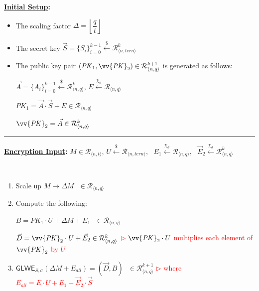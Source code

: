 \begin{tcolorbox}[title={\textbf{\tboxlabel{\ref*{subsec:glwe-public-key-enc}} RLWE Public Key Encryption ($k=1$)}}]

\textbf{\underline{Initial Setup}:} 
\begin{itemize}
\item The scaling factor $\Delta = \left\lfloor\dfrac{q}{t}\right\rfloor$
\item The secret key $\vec{S} = \{S_i\}_{i=0}^{k-1} \xleftarrow{\$} \mathcal{R}_{\langle n, \textit{tern} \rangle}^k$
\item The public key pair $(\mathit{PK}_1, \vv{\mathit{PK}}_2) \in \mathcal{R}_{\langle n, q \rangle}^{k+1}$ is generated as follows:

$\vec{A} = \{A_i\}_{i=0}^{k-1} \xleftarrow{\$} \mathcal{R}_{\langle n, q \rangle}^k$, \text{ } $E \xleftarrow{\chi_{\sigma}} \mathcal{R}_{\langle n, q \rangle}$

$\mathit{PK}_1 = \vec{A} \cdot \vec{S} + E \in \mathcal{R}_{\langle n, q \rangle}$

$\vv{\mathit{PK}}_2 = \vec{A} \in \mathcal{R}_{\langle n, q \rangle}^{k}$

\end{itemize}

\par\noindent\rule{\textwidth}{0.4pt}

\textbf{\underline{Encryption Input}:} $M \in \mathcal{R}_{\langle n, t \rangle}$, \text{ } $U \xleftarrow{\$} \mathcal{R}_{\langle n,\textit{tern} \rangle}, \text{ } E_1 \xleftarrow{\chi_{\sigma}} \mathcal{R}_{\langle n,q \rangle}, \text{ } \vec{E}_2 \xleftarrow{\chi_{\sigma}} \mathcal{R}_{\langle n,q \rangle}^k$

$ $

\begin{enumerate}

\item Scale up $M \longrightarrow \Delta M \text { } \in \mathcal{R}_{\langle n, q\rangle}$

\item Compute the following: 

$B = \mathit{PK}_1\cdot U + \Delta  M + E_1 \text{ } \in \mathcal{R}_{\langle n,q \rangle}$

$\vec{D} = \vv{{\mathit{PK}}}_2 \cdot U + \vec{E}_2 \in \mathcal{R}_{\langle n,q \rangle}^{k}$ \textcolor{red}{ $\rhd$ $\vv{\mathit{PK}}_2 \cdot U$ multiplies each element of $\vv{\mathit{PK}}_2$ by $U$}

\item $\textsf{GLWE}_{S,\sigma}(\Delta M + E_{\mathit{all}}) = (\vec{D}, B) \text{ } \in \mathcal{R}_{\langle n,q \rangle}^{k+1}$  \textcolor{red}{ $\rhd$ where $E_{\mathit{all}} = E \cdot U + E_1 - \vec{E}_2\cdot\vec{S}$}




\end{enumerate}
\end{tcolorbox}
